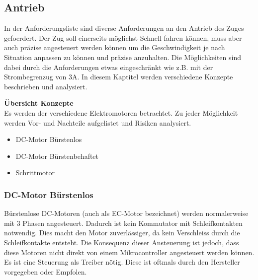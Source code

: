\documentclass[../../main.tex]{subfiles}
\begin{document}
    \subsection{Antrieb}
    In der Anforderungsliste sind diverse Anforderungen an den Antrieb des Zuges gefoerdert.
    Der Zug soll einerseits möglichst Schnell fahren können, muss aber auch präzise angesteuert werden können um die Geschwindigkeit je nach Situation anpassen zu können und präzise anzuhalten.
    Die Möglichkeiten sind dabei durch die Anforderungen etwas eingeschränkt wie z.B. mit der Strombegrenzug von 3A.
    In diesem Kaptitel werden verschiedene Konzepte beschrieben und analysiert.

    \textbf{Übersicht Konzepte}\\
    Es werden der verschiedene Elektromotoren betrachtet. Zu jeder Möglichkeit werden Vor- und Nachteile aufgelistet und Risiken analysiert.

    \begin{itemize}
        \item DC-Motor Bürstenlos
        \item DC-Motor Bürstenbehaftet
        \item Schrittmotor
    \end{itemize}

    \subsubsection{DC-Motor Bürstenlos}

    Bürstenlose DC-Motoren (auch als EC-Motor bezeichnet) werden normalerweise mit 3 Phasen angesteuert. Dadurch ist kein Kommutator mit Schleifkontakten notwendig. Dies macht den Motor zuverlässiger, da kein Verschleiss durch die Schleifkontakte entsteht.
    Die Konsequenz dieser Ansteuerung ist jedoch, dass diese Motoren nicht direkt von einem Mikrocontroller angesteuert werden können. Es ist eine Steuerung als Treiber nötig. Diese ist oftmals durch den Hersteller vorgegeben oder Empfolen.
\end{document}
